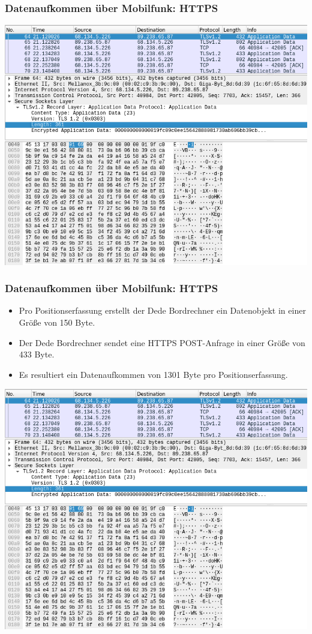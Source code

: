 \begin{frame}
  \frametitle{Datenaufkommen über Mobilfunk: HTTPS}
  \includegraphics[width=0.80\paperwidth]{dede/dede-obc-wireshark-https-post}
\end{frame}

\begin{frame}
  \frametitle{Datenaufkommen über Mobilfunk: HTTPS}
  \begin{itemize}
  \item Pro Positionserfassung erstellt der Dede Bordrechner ein Datenobjekt in einer Größe von 150 Byte.
  \item Der Dede Bordrechner sendet eine HTTPS POST-Anfrage in einer Größe von 433 Byte.
  \item Es resultiert ein Datenaufkommen von 1301 Byte pro Positionserfassung.
  \end{itemize}
  \includegraphics[width=0.5\paperwidth]{dede/dede-obc-wireshark-https-post}
\end{frame}

